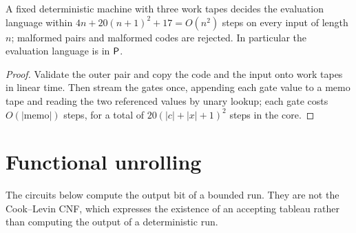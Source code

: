 \begin{theorem}
  \label{thm:circuits-evaluator}
  \leanok
  A fixed deterministic machine with three work tapes decides the evaluation
  language within $4n + 20(n + 1)^2 + 17 = O(n^2)$ steps on every input of
  length $n$; malformed pairs and malformed codes are rejected. In particular
  the evaluation language is in $\mathsf{P}$.
\end{theorem}
\begin{proof}
  \leanok
  Validate the outer pair and copy the code and the input onto work tapes in
  linear time. Then stream the gates once, appending each gate value to a memo
  tape and reading the two referenced values by unary lookup; each gate costs
  $O(|\mathrm{memo}|)$ steps, for a total of $20(|c| + |x| + 1)^2$ steps in
  the core.
\end{proof}

\section{Functional unrolling}
\label{sec:circuits-unrolling}

The circuits below compute the output bit of a bounded run. They are not the
Cook--Levin CNF, which expresses the existence of an accepting tableau rather
than computing the output of a deterministic run.

